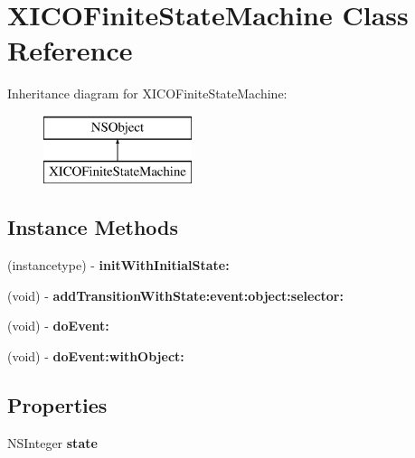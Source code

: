 \hypertarget{class_x_i_c_o_finite_state_machine}{}\section{X\+I\+C\+O\+Finite\+State\+Machine Class Reference}
\label{class_x_i_c_o_finite_state_machine}
Inheritance diagram for X\+I\+C\+O\+Finite\+State\+Machine\+:\begin{figure}[H]
\begin{center}
\leavevmode
\includegraphics[height=2.000000cm]{class_x_i_c_o_finite_state_machine}
\end{center}
\end{figure}
\subsection*{Instance Methods}
\begin{DoxyCompactItemize}
\item 
\hypertarget{class_x_i_c_o_finite_state_machine_a5cf507c4c23eb30ff25ab80beb8f225b}{}\label{class_x_i_c_o_finite_state_machine_a5cf507c4c23eb30ff25ab80beb8f225b} 
(instancetype) -\/ {\bfseries init\+With\+Initial\+State\+:}
\item 
\hypertarget{class_x_i_c_o_finite_state_machine_a22367f78f6afebf0c64884b57482fab7}{}\label{class_x_i_c_o_finite_state_machine_a22367f78f6afebf0c64884b57482fab7} 
(void) -\/ {\bfseries add\+Transition\+With\+State\+:event\+:object\+:selector\+:}
\item 
\hypertarget{class_x_i_c_o_finite_state_machine_ad03ec885d9afaa9feda1465f6f823a79}{}\label{class_x_i_c_o_finite_state_machine_ad03ec885d9afaa9feda1465f6f823a79} 
(void) -\/ {\bfseries do\+Event\+:}
\item 
\hypertarget{class_x_i_c_o_finite_state_machine_a11e5f42516946b1c96c749ab74797825}{}\label{class_x_i_c_o_finite_state_machine_a11e5f42516946b1c96c749ab74797825} 
(void) -\/ {\bfseries do\+Event\+:with\+Object\+:}
\end{DoxyCompactItemize}
\subsection*{Properties}
\begin{DoxyCompactItemize}
\item 
\hypertarget{class_x_i_c_o_finite_state_machine_aac3cfd0a1373278b7972ee9137b631bb}{}\label{class_x_i_c_o_finite_state_machine_aac3cfd0a1373278b7972ee9137b631bb} 
N\+S\+Integer {\bfseries state}
\end{DoxyCompactItemize}



